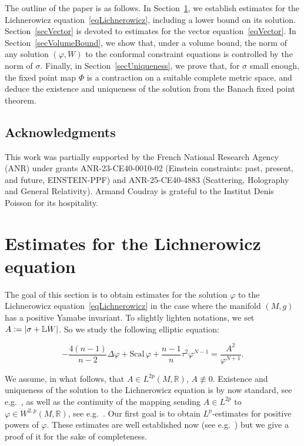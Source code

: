 \documentclass[a4paper, 10pt, reqno]{amsart}
\theoremstyle{plain}
\theoremstyle{remark}
\theoremstyle{definition}
\renewcommand{\phi}{\varphi}
\newcommand{\bR}{\mathbb{R}}
\newcommand{\bL}{\mathbb{L}}
\newcommand{\definedas}{\mathrel{\raise.095ex\hbox{\rm :}\mkern-5.2mu=}}
\newcommand{\scal}{\mathrm{Scal}}
\begin{document}
The outline of the paper is as follows. In Section~\ref{secLichnerowicz}, we
establish estimates for the Lichnerowicz equation~\eqref{eqLichnerowicz},
including a lower bound on its solution. Section~\ref{secVector} is devoted to
estimates for the vector equation~\eqref{eqVector}. In
Section~\ref{secVolumeBound}, we show that, under a volume bound, the norm of
any solution $(\phi, W)$ to the conformal constraint equations is controlled by
the norm of $\sigma$. Finally, in Section~\ref{secUniqueness}, we prove that,
for $\sigma$ small enough, the fixed point map $\Phi$ is a contraction on a
suitable complete metric space, and deduce the existence and uniqueness of the
solution from the Banach fixed point theorem.

\subsection*{Acknowledgments}

This work was partially supported by the French National Research Agency (ANR)
under grants ANR-23-CE40-0010-02 (Einstein constraints: past, present, and
future, EINSTEIN-PPF) and ANR-25-CE40-4883 (Scattering, Holography and General
Relativity). Armand Coudray is grateful to the Institut Denis Poisson for its
hospitality.

\section{Estimates for the Lichnerowicz equation}\label{secLichnerowicz}
The goal of this section is to obtain estimates for the solution $\phi$ to the
Lichnerowicz equation~\eqref{eqLichnerowicz} in the case where the manifold
$(M, g)$ has a positive Yamabe invariant. To slightly lighten notations, we set
$A \definedas |\sigma + \bL W|$. So we study the following elliptic equation:

\begin{equation} \label{eqLich}
    - \frac{4(n-1)}{n-2} \Delta \phi + \scal\,\phi + \frac{n-1}{n} \tau^2 \phi^{N-1} = \frac{A^2}{\phi^{N+1}}.
\end{equation}

We assume, in what follows, that $A \in L^{2p}(M, \bR)$, $A \not\equiv 0$.
Existence and uniqueness of the solution to the Lichnerowicz equation is by now
standard, see e.g.~\cite{GicquaudLichnerowicz}, as well as the continuity of
the mapping sending $A \in L^{2p}$ to $\phi \in W^{2, p}(M, \bR)$, see
e.g.~\cite{DahlGicquaudHumbert}. Our first goal is to obtain $L^p$-estimates
for positive powers of $\phi$. These estimates are well established now (see
e.g.\ \cite[Lemma 2.11 and Proposition 2.12]{Pailleron}) but we give a proof of
it for the sake of completeness.
\end{document}
